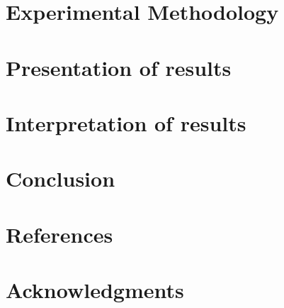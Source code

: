 \documentclass[12pt,a4paper,titlepage]{article}
\begin{document}
\section{Experimental Methodology}

\section{Presentation of results}

\section{Interpretation of results}

\section{Conclusion}

\section{References}

\section{Acknowledgments}
\end{document}
